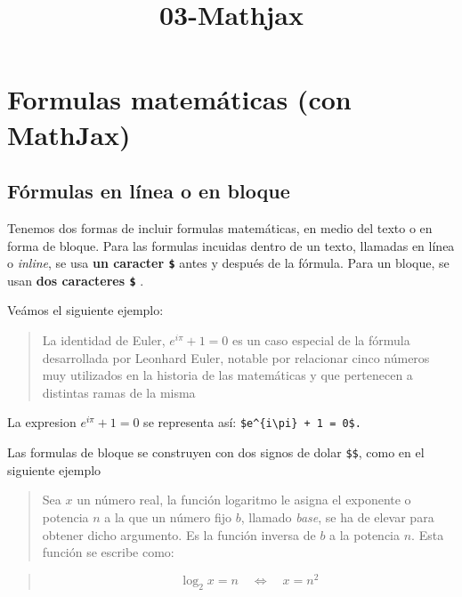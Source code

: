 \documentclass[11pt]{article}
\title{03-Mathjax}
\begin{document}
    
    
    \maketitle
    
    

    
    \section{Formulas matemáticas (con
MathJax)}\label{formulas-matemuxe1ticas-con-mathjax}

    \subsection{Fórmulas en línea o en
bloque}\label{fuxf3rmulas-en-luxednea-o-en-bloque}

Tenemos dos formas de incluir formulas matemáticas, en medio del texto o
en forma de bloque. Para las formulas incuidas dentro de un texto,
llamadas en línea o \emph{inline}, se usa \textbf{un caracter
\texttt{\$}} antes y después de la fórmula. Para un bloque, se usan
\textbf{dos caracteres \texttt{\$} }.

Veámos el siguiente ejemplo:

\begin{quote}
La identidad de Euler, \(e^{i\pi} + 1 = 0\) es un caso especial de la
fórmula desarrollada por Leonhard Euler, notable por relacionar cinco
números muy utilizados en la historia de las matemáticas y que
pertenecen a distintas ramas de la misma
\end{quote}

La expresion \(e^{i\pi} + 1 = 0\) se representa así:
\texttt{\$e\^{}\{i\textbackslash{}pi\}\ +\ 1\ =\ 0\$.}

Las formulas de bloque se construyen con dos signos de dolar
\texttt{\$\$}, como en el siguiente ejemplo

\begin{quote}
Sea \(x\) un número real, la función logaritmo le asigna el exponente o
potencia \(n\) a la que un número fijo \(b\), llamado \emph{base}, se ha
de elevar para obtener dicho argumento. Es la función inversa de \(b\) a
la potencia \(n\). Esta función se escribe como:
\end{quote}

\begin{quote}
\[ \log_2 x = n \quad \iff \quad x = n^2 \]
\end{quote}
\end{document}
